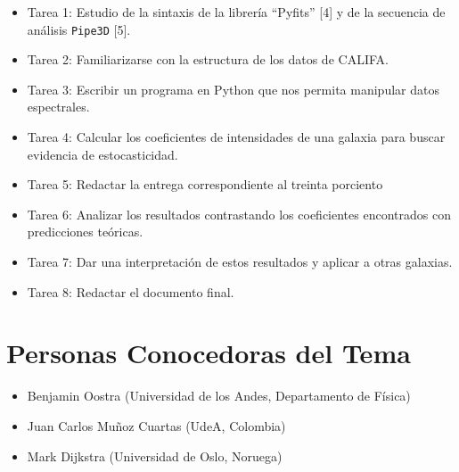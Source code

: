 \documentclass[12pt]{article}
\begin{document}
\begin{itemize}
    \item Tarea 1: Estudio de la sintaxis  de la librer\'ia ``Pyfits'' [4] y de la secuencia de an\'alisis \texttt{Pipe3D} [5].
    \item Tarea 2: Familiarizarse con la estructura de los datos de CALIFA.
    \item Tarea 3: Escribir un programa en Python que nos permita manipular datos espectrales.
    \item Tarea 4: Calcular los coeficientes de intensidades de una galaxia para buscar evidencia de estocasticidad.
    \item Tarea 5: Redactar la entrega correspondiente al treinta porciento
    \item Tarea 6: Analizar los resultados contrastando los coeficientes encontrados con predicciones te\'oricas.
    \item Tarea 7: Dar una interpretaci\'on de estos resultados y aplicar a otras galaxias.
    \item Tarea 8: Redactar el documento final.
\end{itemize}

\section{Personas Conocedoras del Tema}


\begin{itemize}
	\item Benjamin Oostra (Universidad de los Andes, Departamento de F\'isica)
	\item Juan Carlos Mu\~noz Cuartas (UdeA, Colombia)
	\item Mark Dijkstra (Universidad de Oslo, Noruega)
\end{itemize}
\end{document}
